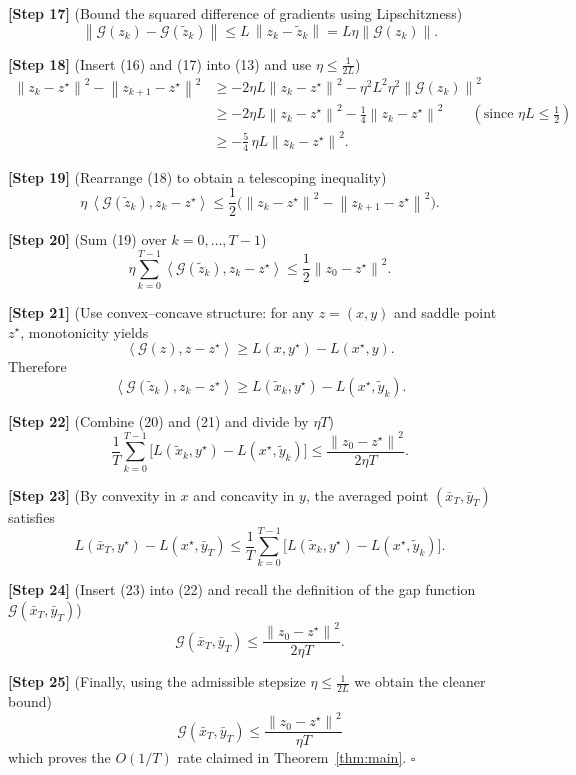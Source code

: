 \documentclass{article}
\newcommand{\norm}[1]{\left\|#1\right\|}
\newcommand{\inner}[2]{\left\langle #1,#2 \right\rangle}
\newcommand{\G}{\mathcal{G}}
\begin{document}
\noindent\textbf{[Step 17]} (Bound the squared difference of gradients using Lipschitzness)
\[
\norm{\G(z_k)-\G(\tilde z_k)}\le L\,\norm{z_k-\tilde z_k}=L\eta\norm{\G(z_k)}.
\tag{17}
\]

\noindent\textbf{[Step 18]} (Insert (16) and (17) into (13) and use $\eta\le\frac1{2L}$)
\[
\begin{aligned}
\norm{z_k-z^\star}^2-\norm{z_{k+1}-z^\star}^2
&\ge -2\eta L\norm{z_k-z^\star}^{2}
-\eta^{2}L^{2}\eta^{2}\norm{\G(z_k)}^{2}\\
&\ge -2\eta L\norm{z_k-z^\star}^{2}
-\frac{1}{4}\norm{z_k-z^\star}^{2}\qquad(\text{since }\eta L\le\tfrac12)\\
&\ge -\frac{5}{4}\, \eta L \norm{z_k-z^\star}^{2}.
\end{aligned}
\tag{18}
\]

\noindent\textbf{[Step 19]} (Rearrange (18) to obtain a telescoping inequality)
\[
\eta\,\inner{\G(\tilde z_k)}{z_k-z^\star}
\le \frac{1}{2}\bigl(\norm{z_k-z^\star}^{2}-\norm{z_{k+1}-z^\star}^{2}\bigr).
\tag{19}
\]

\noindent\textbf{[Step 20]} (Sum (19) over $k=0,\dots,T-1$)
\[
\eta\sum_{k=0}^{T-1}\inner{\G(\tilde z_k)}{z_k-z^\star}
\le \frac{1}{2}\norm{z_0-z^\star}^{2}.
\tag{20}
\]

\noindent\textbf{[Step 21]} (Use convex–concave structure: for any $z=(x,y)$ and saddle point $z^\star$, monotonicity yields
\[
\inner{\G(z)}{z-z^\star}\ge L(x,y^\star)-L(x^\star,y).
\]
Therefore
\[
\inner{\G(\tilde z_k)}{z_k-z^\star}
\ge L(\tilde x_k,y^\star)-L(x^\star,\tilde y_k).
\tag{21}
\]

\noindent\textbf{[Step 22]} (Combine (20) and (21) and divide by $\eta T$)
\[
\frac{1}{T}\sum_{k=0}^{T-1}\bigl[ L(\tilde x_k,y^\star)-L(x^\star,\tilde y_k)\bigr]
\le \frac{\norm{z_0-z^\star}^{2}}{2\eta T}.
\tag{22}
\]

\noindent\textbf{[Step 23]} (By convexity in $x$ and concavity in $y$, the averaged point $(\bar x_T,\bar y_T)$ satisfies
\[
L(\bar x_T,y^\star)-L(x^\star,\bar y_T)
\le \frac{1}{T}\sum_{k=0}^{T-1}\bigl[ L(\tilde x_k,y^\star)-L(x^\star,\tilde y_k)\bigr].
\tag{23}
\]

\noindent\textbf{[Step 24]} (Insert (23) into (22) and recall the definition of the gap function $\mathcal{G}(\bar x_T,\bar y_T)$)
\[
\mathcal{G}(\bar x_T,\bar y_T)
\le \frac{\norm{z_0-z^\star}^{2}}{2\eta T}.
\tag{24}
\]

\noindent\textbf{[Step 25]} (Finally, using the admissible stepsize $\eta\le\frac1{2L}$ we obtain the cleaner bound)
\[
\boxed{\;
\mathcal{G}(\bar x_T,\bar y_T)\le\frac{\norm{z_0-z^\star}^{2}}{\eta T}\;
}
\tag{25}
\]
which proves the $O(1/T)$ rate claimed in Theorem~\ref{thm:main}. $\square$
\end{document}
